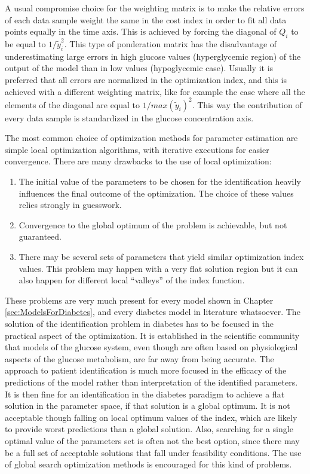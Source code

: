 A usual compromise choice for the weighting matrix is to make the relative errors of each data sample weight the same in the cost index in order to fit all data points equally in the time axis. This is achieved by forcing the diagonal of $Q_{i}$ to be equal to $1/\tilde{y}_{i}^{2}$. This type of ponderation matrix has the disadvantage of underestimating large errors in high glucose values (hyperglycemic region) of the output of the model than in low values (hypoglycemic case). Usually it is preferred that all errors are normalized in the optimization index, and this is achieved with a different weighting matrix, like for example the case where all the elements of the diagonal are equal to $1/max(\tilde{y}_{i})^{2}$. This way the contribution of every data sample is standardized in the glucose concentration axis.

The most common choice of optimization methods for parameter estimation are simple local optimization algorithms, with iterative executions for easier convergence. There are many drawbacks to the use of local optimization:

\begin{enumerate}
	\item The initial value of the parameters to be chosen for the identification heavily influences the final outcome of the optimization. The choice of these values relies strongly in guesswork.
	\item Convergence to the global optimum of the problem is achievable, but not guaranteed.
	\item There may be several sets of parameters that yield similar optimization index values. This problem may happen with a very flat solution region but it can also happen for different local ``valleys'' of the index function.
\end{enumerate}

These problems are very much present for every model shown in Chapter \ref{sec:ModelsForDiabetes}, and every diabetes model in literature whatsoever. The solution of the identification problem in diabetes has to be focused in the practical aspect of the optimization. It is established in the scientific community that models of the glucose system, even though are often based on physiological aspects of the glucose metabolism, are far away from being accurate. The approach to patient identification is much more focused in the efficacy of the predictions of the model rather than interpretation of the identified parameters. It is then fine for an identification in the diabetes paradigm to achieve a flat solution in the parameter space, if that solution is a global optimum. It is not acceptable though falling on local optimum values of the index, which are likely to provide worst predictions than a global solution. Also, searching for a single optimal value of the parameters set is often not the best option, since there may be a full set of acceptable solutions that fall under feasibility conditions. The use of global search optimization methods is encouraged for this kind of problems.

